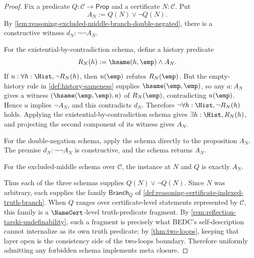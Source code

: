 \begin{proof}
Fix a predicate $Q:\mathcal C\to\mathsf{Prop}$ and a certificate $N:\mathcal C$. Put
$$
A_N := Q(N)\vee\neg Q(N).
$$
By \autoref{lem:reasoning-excluded-middle-branch-double-negated}, there is a constructive witness $d_N:\neg\neg A_N$.

For the existential-by-contradiction schema, define a history predicate
$$
R_N(h) := \hsame(h,\emp)\land A_N.
$$
If $u:\forall h:\Hist,\neg R_N(h)$, then $u(\emp)$ refutes $R_N(\emp)$. But the empty-history rule in \autoref{def:history-sameness} supplies $\hsame(\emp,\emp)$, so any $a:A_N$ gives a witness $(\hsame(\emp,\emp),a)$ of $R_N(\emp)$, contradicting $u(\emp)$. Hence $u$ implies $\neg A_N$, and this contradicts $d_N$. Therefore $\neg\forall h:\Hist,\neg R_N(h)$ holds. Applying the existential-by-contradiction schema gives $\exists h:\Hist,R_N(h)$, and projecting the second component of its witness gives $A_N$.

For the double-negation schema, apply the schema directly to the proposition $A_N$. The premise $d_N:\neg\neg A_N$ is constructive, and the schema returns $A_N$.

For the excluded-middle schema over $\mathcal C$, the instance at $N$ and $Q$ is exactly $A_N$.

Thus each of the three schemas supplies $Q(N)\vee\neg Q(N)$. Since $N$ was arbitrary, each supplies the family $\mathsf{Branch}_Q$ of \autoref{def:reasoning-certificate-indexed-truth-branch}. When $Q$ ranges over certificate-level statements represented by $\mathcal C$, this family is a $\NameCert$-level truth-predicate fragment. By \autoref{rem:reflection-tarski-undefinability}, such a fragment is precisely what BEDC's self-description cannot internalize as its own truth predicate; by \autoref{thm:two-loops}, keeping that layer open is the consistency side of the two-loops boundary. Therefore uniformly admitting any forbidden schema implements meta closure.
\end{proof}
